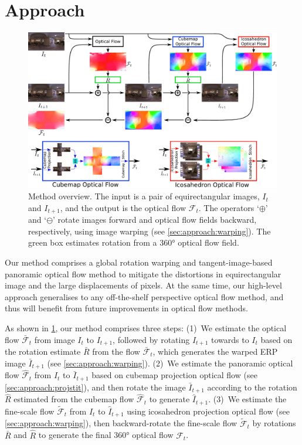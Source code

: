 \section{Approach}
\label{sec:approach}

\begin{figure}%
	\centering
	\includegraphics[width=0.95\linewidth]{images/method_pipeline_1.pdf}
	\caption{Method overview.
		The input is a pair of equirectangular images, $I_t$ and $I_{t+1}$, and the output is the optical flow $\mathcal{F}_t$.
		The operators `$\oplus$' and `$\ominus$' rotate images forward and optical flow fields backward, respectively, using image warping (see \cref{sec:approach:warping}).
		The green box estimates  rotation from a 360° optical flow field.
	}
	\label{fig:approach:pipeline}
\end{figure}

Our method comprises a global rotation warping and tangent-image-based panoramic optical flow method to mitigate the distortions in equirectangular image and the large displacements of pixels.
At the same time, our high-level approach generalises to any off-the-shelf perspective optical flow method, and thus will benefit from future improvements in optical flow methods.


As shown in \cref{fig:approach:pipeline}, our method comprises three steps:
%
(1)~We estimate the optical flow $\bar{\mathcal{F}}_t$ from  image $I_{t}$ to ${I_{t+1}}$, followed by rotating $I_{t+1}$ towards to $I_{t}$ based on the rotation estimate $\bar{R}$ from the flow $\bar{\mathcal{F}}_t$, which generates the warped ERP image ${\bar{I}}_{t+1}$ (see \cref{sec:approach:warping}).
%
(2)~We estimate the panoramic optical flow ${\hat{\mathcal{F}}}_t$ from $I_{t}$ to ${\bar{I}}_{t+1}$ based on cubemap projection optical flow (see \cref{sec:approach:projstit}), and then rotate the image ${\bar{I}}_{t+1}$ according to the rotation $\hat{R}$ estimated from the cubemap flow ${\hat{\mathcal{F}}}_t$ to generate ${\hat{I}}_{t+1}$.
%
(3)~We estimate the fine-scale flow $\tilde{\mathcal{F}}_t$ from $I_{t}$ to ${\hat{I}}_{t+1}$ using icosahedron projection optical flow (see \cref{sec:approach:warping}), then backward-rotate the fine-scale flow $\tilde{\mathcal{F}}_t$ by rotations $\bar{R}$ and $\hat{R}$ to generate the final 360° optical flow $\mathcal{F}_t$.


